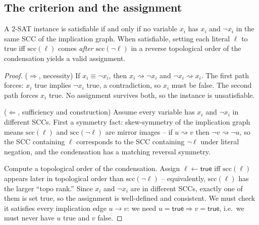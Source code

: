 \subsection{The criterion and the assignment}

\begin{theorem}
\label{ch05:thm-2sat}
A 2-SAT instance is satisfiable if and only if no variable $x_i$ has $x_i$ and $\lnot x_i$ in the same SCC of the implication graph. When satisfiable, setting each literal $\ell$ to \textsf{true} iff $\mathrm{scc}(\ell)$ comes \emph{after} $\mathrm{scc}(\lnot\ell)$ in a reverse topological order of the condensation yields a valid assignment.
\end{theorem}

\begin{proof}
($\Rightarrow$, necessity) If $x_i\equiv\lnot x_i$, then $x_i\rightsquigarrow\lnot x_i$ and $\lnot x_i\rightsquigarrow x_i$. The first path forces: $x_i$ true implies $\lnot x_i$ true, a contradiction, so $x_i$ must be false. The second path forces $x_i$ true. No assignment survives both, so the instance is unsatisfiable.

($\Leftarrow$, sufficiency and construction) Assume every variable has $x_i$ and $\lnot x_i$ in different SCCs. First a symmetry fact: skew-symmetry of the implication graph means $\mathrm{scc}(\ell)$ and $\mathrm{scc}(\lnot\ell)$ are mirror images -- if $u\rightsquigarrow v$ then $\lnot v\rightsquigarrow\lnot u$, so the SCC containing $\ell$ corresponds to the SCC containing $\lnot\ell$ under literal negation, and the condensation has a matching reversal symmetry.

Compute a topological order of the condensation. Assign $\ell\gets\textsf{true}$ iff $\mathrm{scc}(\ell)$ appears later in topological order than $\mathrm{scc}(\lnot\ell)$ -- equivalently, $\mathrm{scc}(\ell)$ has the larger ``topo rank.'' Since $x_i$ and $\lnot x_i$ are in different SCCs, exactly one of them is set true, so the assignment is well-defined and consistent. We must check it satisfies every implication edge $u\to v$: we need $u=\textsf{true} \Rightarrow v=\textsf{true}$, i.e.\ we must never have $u$ true and $v$ false.


\end{proof}
